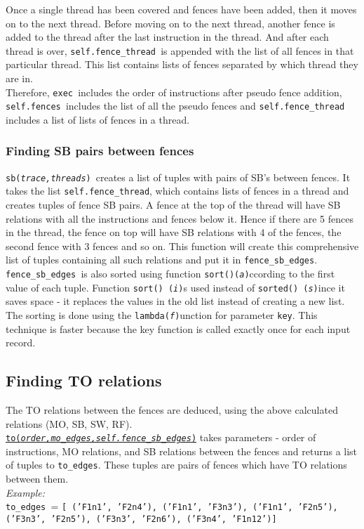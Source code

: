 \documentclass{article}
\newcommand{\var}[1]{\color{OliveGreen} \texttt{#1}\color{black}}
\newcommand{\fun}[2]{\color{Sepia}\texttt{#1(\color{Gray}\textit{#2}\color{Sepia})}\color{black}}
\newcommand{\varinfo}[1]{\scriptsize \texttt{#1} \normalsize}
\begin{document}
Once a single thread has been covered and fences have been added, then it moves on to the next thread. Before moving on to the next thread, another fence is added to the thread after the last instruction in the thread. And after each thread is over, \var{self.fence\_thread }is appended with the list of all fences in that particular thread. This list contains lists of fences separated by which thread they are in.\\

Therefore, \var{exec }includes the order of instructions after pseudo fence addition, \var{self.fences }includes the list of all the pseudo fences and \var{self.fence\_thread }includes a list of lists of fences in a thread.

\subsubsection{Finding SB pairs between fences}
\fun{sb}{trace,threads}\ creates a list of tuples with pairs of SB's between fences. It takes the list \var{self.fence\_thread}, which contains lists of fences in a thread and creates tuples of fence SB pairs. A fence at the top of the thread will have SB relations with all the instructions and fences below it. Hence if there are 5 fences in the thread, the fence on top will have SB relations with 4 of the fences, the second fence with 3 fences and so on. This function will create this comprehensive list of tuples containing all such relations and put it in \var{fence\_sb\_edges}.\\

\var{fence\_sb\_edges }is also sorted using function \fun{sort()} according to the first value of each tuple. Function \fun{sort() } is used instead of \fun{sorted() } since it saves space - it replaces the values in the old list instead of creating a new list.\\
The sorting is done using the \fun{lambda} function for parameter \texttt{key}. This technique is faster because the key function is called exactly once for each input record.

\subsection{Finding TO relations}
The TO relations between the fences are deduced, using the above calculated relations (MO, SB, SW, RF).\\
\href{to.tex}{\fun{to}{order,mo\_edges,self.fence\_sb\_edges}} takes parameters - order of instructions, MO relations, and SB relations between the fences and returns a list of tuples to \var{to\_edges}. These tuples are pairs of fences which have TO relations between them.\\
\textit{Example:}\\
\var{to\_edges }= \varinfo{[
('F1n1', 'F2n4'), ('F1n1', 'F3n3'), ('F1n1', 'F2n5'), ('F3n3', 'F2n5'), 
('F3n3', 'F2n6'), ('F3n4', 'F1n12')]}
\end{document}
